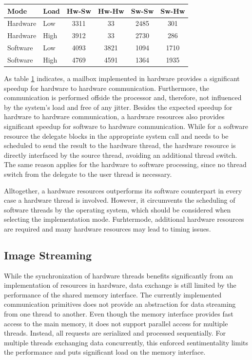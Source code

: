 \begin{table}
	\centering
	\label{tab:mbox_turn}
	\begin{tabular}{llcccc}
	\hline
	\textbf{Mode} & \textbf{Load} & \textbf{Hw-Sw} & \textbf{Hw-Hw} & \textbf{Sw-Sw} & \textbf{Sw-Hw}\\
	\hline
	Hardware & Low & 3311 & 33 & 2485 & 301\\
	Hardware & High & 3912 & 33 & 2730 & 286\\
	Software & Low & 4093 & 3821 & 1094 & 1710\\
	Software & High & 4769 & 4591 & 1364 & 1935\\
	\hline
	\end{tabular}
\end{table}
As table \ref{tab:mbox_turn} indicates, a mailbox implemented in hardware
provides a significant speedup for hardware to hardware communication.
Furthermore, the communication is performed offside the processor and,
therefore, not influenced by the system's load and free of any jitter. Besides
the expected speedup for hardware to hardware communication, a hardware
resources also provides significant speedup for software to hardware
communication. While for a software resource the delegate blocks in the
appropriate system call and needs to be scheduled to send the result to the
hardware thread, the hardware resource is directly interfaced by the source
thread, avoiding an additional thread switch. The same reason applies for the
hardware to software processing, since no thread switch from the delegate to
the user thread is necessary.

Alltogether, a hardware resources outperforms its software counterpart in
every case a hardware thread is involved. However, it circumvents the
scheduling of software threads by the operating system, which should be
considered when selecting the implementation mode. Furhtermode, additional
hardware resources are required and many hardware resources may lead to timing
issues.

\subsection{Image Streaming}
While the synchronization of hardware threads benefits significantly from an
implementation of resources in hardware, data exchange is still limited by the
performance of the shared memory interface. The currently implemented
communication primitives does not provide an abstraction for data streaming
from one thread to another. Even though the memory interface provides fast
access to the main memory, it does not support parallel access for multiple
threads. Instead, all requests are serialized and processed sequentially. For
multiple threads exchanging data concurrently, this enforced sentimentality
limits the performance and puts significant load on the memory interface.

